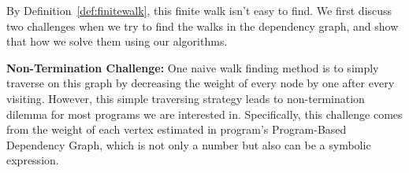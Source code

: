 By Definition~\ref{def:finitewalk}, this finite walk isn't easy to find. We first discuss two challenges when we try to find the walks in the dependency graph, and show that how we solve them using our algorithms.

\textbf{Non-Termination Challenge:}
One naive walk finding method is to simply traverse on this graph by decreasing the weight of every node by one after every visiting. However, this simple 
traversing strategy leads to non-termination dilemma for most programs we are interested in. 
Specifically, this challenge comes from the weight of each vertex estimated in program's Program-Based Dependency Graph,
which is not only a number but also can be a symbolic expression. 

